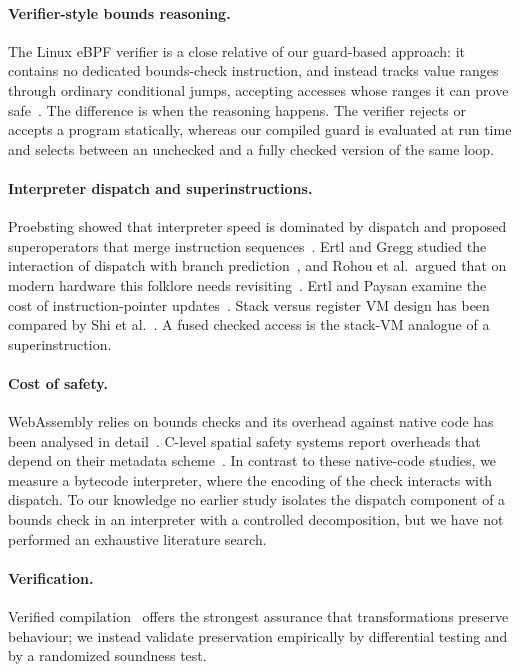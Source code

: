 \documentclass[11pt,a4paper]{article}
\begin{document}
\paragraph{Verifier-style bounds reasoning.} The Linux eBPF verifier is a close relative of our guard-based approach: it contains no dedicated bounds-check instruction, and instead tracks value ranges through ordinary conditional jumps, accepting accesses whose ranges it can prove safe~\cite{vishwanathan2023}. The difference is when the reasoning happens. The verifier rejects or accepts a program statically, whereas our compiled guard is evaluated at run time and selects between an unchecked and a fully checked version of the same loop.

\paragraph{Interpreter dispatch and superinstructions.} Proebsting showed that interpreter speed is dominated by dispatch and proposed superoperators that merge instruction sequences~\cite{proebsting1995}. Ertl and Gregg studied the interaction of dispatch with branch prediction~\cite{ertl2003,casey2007}, and Rohou et al.\ argued that on modern hardware this folklore needs revisiting~\cite{rohou2015}. Ertl and Paysan examine the cost of instruction-pointer updates~\cite{ertl2024}. Stack versus register VM design has been compared by Shi et al.~\cite{shi2008}. A fused checked access is the stack-VM analogue of a superinstruction.

\paragraph{Cost of safety.} WebAssembly relies on bounds checks and its overhead against native code has been analysed in detail~\cite{haas2017,jangda2019}. C-level spatial safety systems report overheads that depend on their metadata scheme~\cite{nagarakatte2009,serebryany2012,akritidis2009,necula2005,jones1997}. In contrast to these native-code studies, we measure a bytecode interpreter, where the encoding of the check interacts with dispatch. To our knowledge no earlier study isolates the dispatch component of a bounds check in an interpreter with a controlled decomposition, but we have not performed an exhaustive literature search.

\paragraph{Verification.} Verified compilation~\cite{leroy2009} offers the strongest assurance that transformations preserve behaviour; we instead validate preservation empirically by differential testing and by a randomized soundness test.
\end{document}
